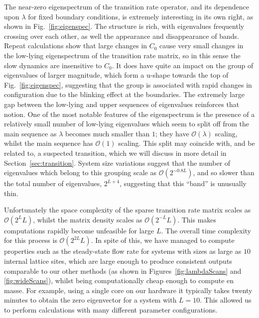 \documentclass[
reprint, amsmath,amssymb,
]{revtex4-1}
\begin{document}
The near-zero eigenspectrum of the transition rate operator, and its dependence upon $\lambda$ for fixed boundary conditions, is extremely interesting in its own right, as shown in Fig.~\ref{fig:eigenspec}.
The structure is rich, with eigenvalues frequently crossing over each other, as well the appearance and disappearance of bands.
Repeat calculations show that large changes in $C_0$ cause very small changes in the low-lying eigenspectrum of the transition rate matrix, so in this sense the slow dynamics are insensitive to $C_0$. It does have quite an impact
on the group of eigenvalues of larger magnitude, which form a u-shape towards the top of Fig.~\ref{fig:eigenspec}, suggesting that the group is associated with rapid changes in configuration due to the blinking effect at 
the boundaries. The extremely large gap between the low-lying and upper sequences of eigenvalues reinforces that notion.
One of the most notable
features of the eigenspectrum is the presence of a relatively small number of low-lying eigenvalues which seem to split off from the main sequence as $\lambda$ becomes much smaller than $1$; they have $\mathcal{O}(\lambda)$ scaling,
whilst the main sequence
has $\mathcal{O}(1)$ scaling. This split may coincide with, and be related to, a suspected transition, which we will discuss in more detail in Section~\ref{sec:transition}. System size variations suggest that the number of
eigenvalues which belong to this grouping scale as $\mathcal{O}(2^{\sim 0.8L})$, and so slower than the total number of eigenvalues, $2^{L+4}$, suggesting that this ``band'' is unusually thin.


Unfortunately the space complexity of the sparse transition rate matrix scales as $\mathcal{O}(2^L L)$, whilst the matrix density scales as $\mathcal{O}(2^{-L} L)$.
This makes computations rapidly become unfeasible for large $L$. The overall time complexity for this process is $\mathcal{O}(2^{2L}L)$.
In spite of this, we have managed to compute properties such as the steady-state flow rate for systems with sizes as large as $10$ internal lattice sites,
which are large enough to produce consistent outputs comparable to our other methods (as shown in Figures~\ref{fig:lambdaScans} and \ref{fig:wideScans}), whilst being computationally cheap enough to compute en masse. For example, using a single core on our hardware it typically takes twenty minutes
to obtain the zero eigenvector for a system with $L=10$. This allowed us to perform calculations with many different parameter configurations.
\end{document}
